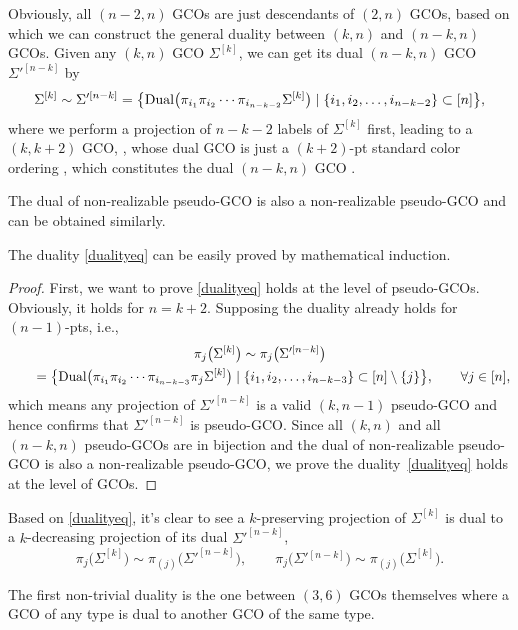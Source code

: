\documentclass[pdftex]{sigma}
\theoremstyle{definition}
\def \ba {\begin{eqnarray}}
\def \ea {\end{eqnarray}}
\numberwithin{equation}{section}
\begin{document}
Obviously, all $(n-2,n)$ GCOs are just descendants of $(2,n)$ GCOs, based on which we can construct the general duality between $(k,n)$ and $(n-k,n)$ GCOs. Given any $(k,n)$ GCO $\Sigma^{[k]}$, we can get its dual $(n-k,n)$ GCO $\Sigma'^{[n-k]}$ by
\ba
\label{dualityeq}
\Sigma^{[k]} \sim \Sigma'^{[n-k]}=
\bigl\{
{\rm Dual}\big( \pi_{i_1} \pi_{i_2} \cdots \pi_{i_{n-k-2}}
\Sigma^{[k]} \big)
\mid \{i_1,i_2,\dots,i_{n-k-2}\} \subset [n]
\bigr\},
\ea
where we perform a projection of $n-k-2$ labels of $\Sigma^{[k]}$ first, leading to a $(k,k+2)$ GCO, , whose dual GCO  is just a $(k+2)$-pt standard color ordering , which constitutes the dual $(n-k,n)$ GCO .

The dual of non-realizable pseudo-GCO is also a non-realizable pseudo-GCO and can be obtained similarly.

The duality \eqref{dualityeq} can be easily proved by mathematical induction.
\begin{proof}
First, we want to prove \eqref{dualityeq} holds at the level of pseudo-GCOs.
Obviously, it holds for $n=k+2$.
Supposing the duality already holds for $(n-1)$-pts,
i.e.,
\begin{gather*}
\pi_{j}\big(\Sigma^{[k]}\big) \sim \pi_{j}\big(\Sigma'^{[n-k]}\big)\\
\qquad=
\bigl\{
{\rm Dual}\big( \pi_{i_1} \pi_{i_2} \cdots \pi_{i_{n-k-3}}\pi_{j}
\Sigma^{[k]} \big)
\mid \{i_1,i_2,\dots,i_{n-k-3}\} \subset [n] \setminus \{j\}
\bigr\},
\qquad
\forall j\in [n],
\end{gather*}
which means any projection of $\Sigma'^{[n-k]}$ is a valid $(k,n-1)$ pseudo-GCO and hence confirms that $\Sigma'^{[n-k]}$ is pseudo-GCO. Since all $(k,n)$ and all $(n-k,n)$ pseudo-GCOs are in bijection and the dual of non-realizable pseudo-GCO is also a non-realizable pseudo-GCO, we prove the duality~\eqref{dualityeq} holds at the level of GCOs.
\end{proof}

Based on \eqref{dualityeq}, it's clear to see a $k$-preserving projection of $\Sigma^{[k]}$ is dual to a $k$-decreasing projection of its dual $\Sigma'^{[n-k]}$,
\[
\pi_{j}\big(\Sigma^{[k]} \big) \sim \pi_{(j)}\big(\Sigma'^{[n-k]} \big),\qquad \pi_{j}\big(\Sigma'{}^{[n-k]}\big) \sim \pi_{(j)}\big(\Sigma^{[k]}\big) .
\]

The first non-trivial duality is the one between $(3,6)$ GCOs themselves where a GCO of any type is dual to another GCO of the same type.
\end{document}
